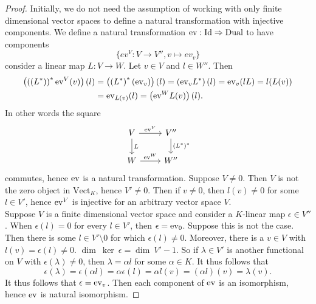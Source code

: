     \begin{proof}
        Initially, we do not need the assumption of working with only finite dimensional vector spaces to define a natural transformation with injective components. We define a natural transformation $\mathrm{ev}:\mathrm{Id}\Rightarrow \mathrm{Dual}$ to have components
        $$
            \{ev^V : V\rightarrow V'', v\mapsto ev_v\}
        $$
        consider a linear map $L: V\rightarrow W$. Let $v\in V$ and $l\in W''$. Then 
        \begin{align*}
            \left(\left(\left(L^\ast\right)\right)^\ast \mathrm{ev}^V(v)\right)(l) &=\left(\left(L^\ast\right)^\ast(\mathrm{ev}_v)\right)(l) = \left(\mathrm{ev}_vL^\ast\right)(l)= \mathrm{ev}_v(lL)= l(L(v))\\
            &= \mathrm{ev}_{L(v)}(l)=\left(\mathrm{ev}^W L(v)\right)(l).
        \end{align*}
        In other words the square 
        $$
            \begin{tikzcd}
                V \arrow[d,"L"]\arrow[r,"\ev^V"] & V''\arrow[d,"\left(L^\ast\right)^\ast"]\\
                W \arrow[r,"\ev^W"] & W''
            \end{tikzcd}
        $$
        commutes, hence $\mathrm{ev} $ is a natural transformation. Suppose $V\neq 0$. Then $V$ is not the zero object in $\mathrm{Vect}_K$, hence $V'\neq 0$. Then if $v\neq 0$, then $l(v)\neq 0$ for some $l\in V'$, hence $\mathrm{ev}^V$ is injective for an arbitrary vector space $V$.\\
        Suppose $V$ is a finite dimensional vector space and consider a $K$-linear map $\epsilon\in V''$. When $\epsilon(l)=0$ for every $l\in V'$, then $\epsilon = \mathrm{ev}_0$. Suppose this is not the case. Then there is some $l\in V'\setminus 0$ for which $\epsilon(l)\neq 0$. Moreover, there is a $v\in V$  with $l(v)=\epsilon(l)\neq 0$. $\dim \ \ker \ \epsilon = \dim \ V' -1$. So if $\lambda\in V'$ is another functional on $V$ with $\epsilon(\lambda)\neq 0$, then $\lambda = \alpha l$ for some $\alpha\in K$. It thus follows that
        $$
            \epsilon(\lambda)=\epsilon(\alpha l)=\alpha\epsilon(l)=\alpha l(v)= (\alpha l)(v)=\lambda(v).
        $$      
        It thus follows that $\epsilon = \mathrm{ev}_v$. Then each component of $\mathrm{ev}$ is an isomorphism, hence $\mathrm{ev}$ is natural isomorphism. 
    \end{proof}
